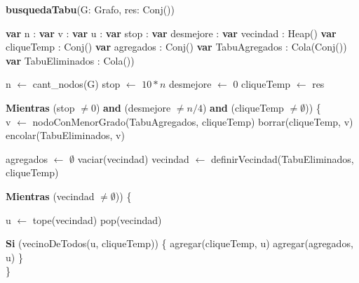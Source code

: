 \textbf{busquedaTabu}(G: Grafo, res: Conj(\entero)) \\
\begin{algorithm}[H]
\footnotesize 
\linesnumbered
\incmargin{3em}

	\BlankLine
	\textbf{var} n 				: \entero												{}
	\textbf{var} v 				: \entero												{}
	\textbf{var} u 				: \entero												{}
	\textbf{var} stop				: \entero					 							{}
	\textbf{var} desmejore		: \entero												{}
	\textbf{var} vecindad 		: Heap(\entero)							 			
	\textbf{var} cliqueTemp 		: Conj(\entero) 										
	\textbf{var} agregados 		: Conj(\entero) 										
	\textbf{var} TabuAgregados 	: Cola(Conj(\entero))								 	
	\textbf{var} TabuEliminados 	: Cola(\entero)) 										
	
	\BlankLine \BlankLine
	n 				$\leftarrow$ cant\_nodos(G)											
	stop 			$\leftarrow$ $10*n$													
	desmejore 		$\leftarrow$ 0														
	cliqueTemp 	$\leftarrow$ res														

	\BlankLine \BlankLine		
	\textbf{Mientras} (stop $\neq 0$) \textbf{and} (desmejore $\neq n/4$) \textbf{and} (cliqueTemp $\neq \emptyset$)) \{ \\

	\BlankLine	
	\tab v $\leftarrow$ nodoConMenorGrado(TabuAgregados, cliqueTemp)				
	\tab borrar(cliqueTemp, v) 																
	\tab encolar(TabuEliminados, v) 														

	\BlankLine \BlankLine		
	\tab agregados $\leftarrow$ $\emptyset$											
	\tab vaciar(vecindad)																	
	\tab vecindad $\leftarrow$ definirVecindad(TabuEliminados, cliqueTemp) 			

	\BlankLine \BlankLine		
	\tab \textbf{Mientras} (vecindad $\neq \emptyset$)) \{							

	\BlankLine
	\tab \tab u $\leftarrow$ tope(vecindad)												
	\tab \tab pop(vecindad)																

	\BlankLine		
	\tab \tab \textbf{Si} (vecinoDeTodos(u, cliqueTemp)) \{ 							
	\tab \tab \tab agregar(cliqueTemp, u) 												
	\tab \tab \tab agregar(agregados, u)												
	\tab \tab	\} \\
	\tab \}


\end{algorithm}
